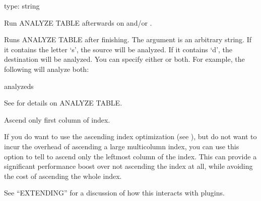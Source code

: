 \documentclass[letterpaper,10pt,english]{sphinxmanual}
\begin{document}
\begin{fulllineitems}
\label{\detokenize{mariadb-archiver:cmdoption-mariadb-archiver-analyze}}
type: string

Run ANALYZE TABLE afterwards on {\hyperref[\detokenize{mariadb-archiver:cmdoption-mariadb-archiver-source}]{}} and/or {\hyperref[\detokenize{mariadb-archiver:cmdoption-mariadb-archiver-dest}]{}}.

Runs ANALYZE TABLE after finishing.  The argument is an arbitrary string.  If it
contains the letter ‘s’, the source will be analyzed.  If it contains ‘d’, the
destination will be analyzed.  You can specify either or both.  For example, the
following will analyze both:

\begin{sphinxVerbatim}[commandchars=\\\{\}]
\PYGZhy{}\PYGZhy{}analyzeds
\end{sphinxVerbatim}

See  for details on ANALYZE
TABLE.

\end{fulllineitems}


\begin{fulllineitems}
\label{\detokenize{mariadb-archiver:cmdoption-mariadb-archiver-ascend-first}}
Ascend only first column of index.

If you do want to use the ascending index optimization (see {\hyperref[\detokenize{mariadb-archiver:cmdoption-mariadb-archiver-no-ascend}]{}}),
but do not want to incur the overhead of ascending a large multi\sphinxhyphen{}column index,
you can use this option to tell  to ascend only the leftmost column
of the index.  This can provide a significant performance boost over not
ascending the index at all, while avoiding the cost of ascending the whole
index.

See “EXTENDING” for a discussion of how this interacts with plugins.

\end{fulllineitems}
\end{document}

